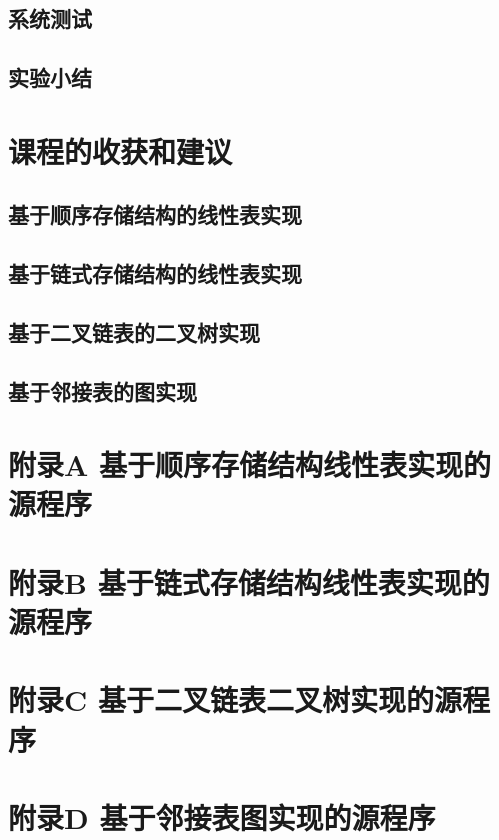 \documentclass[supercite]{Experimental_Report}
\theoremstyle{definition}
\begin{document}
\subsection{系统测试}

\subsection{实验小结}

\newpage

\section{课程的收获和建议}



\subsection{基于顺序存储结构的线性表实现}



\subsection{基于链式存储结构的线性表实现}



\subsection{基于二叉链表的二叉树实现}



\subsection{基于邻接表的图实现}


\section{附录A 基于顺序存储结构线性表实现的源程序}
\section{附录B 基于链式存储结构线性表实现的源程序}
\section{附录C 基于二叉链表二叉树实现的源程序}
\section{附录D 基于邻接表图实现的源程序}
\end{document}
